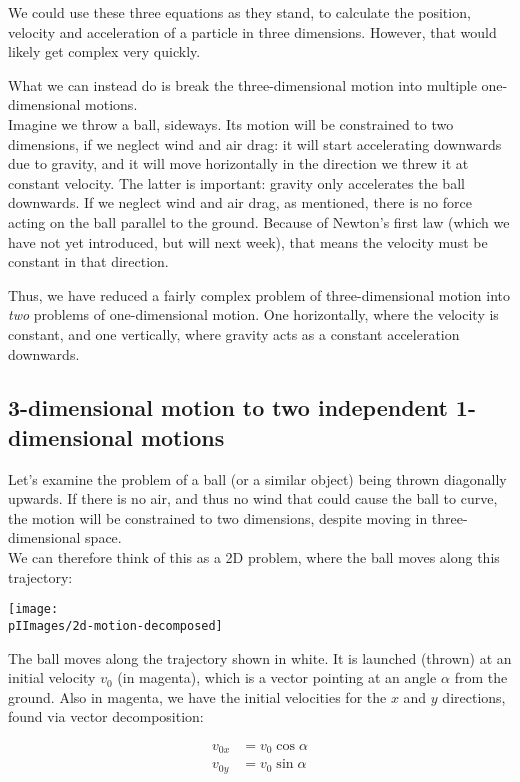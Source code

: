 We could use these three equations as they stand, to calculate the position, velocity and acceleration of a particle in three dimensions. However, that would likely get complex very quickly.

What we can instead do is break the three-dimensional motion into multiple one-dimensional motions.\\
Imagine we throw a ball, sideways. Its motion will be constrained to two dimensions, if we neglect wind and air drag: it will start accelerating downwards due to gravity, and it will move horizontally in the direction we threw it at constant velocity. The latter is important: gravity only accelerates the ball downwards. If we neglect wind and air drag, as mentioned, there is no force acting on the ball parallel to the ground. Because of Newton's first law (which we have not yet introduced, but will next week), that means the velocity must be constant in that direction.

Thus, we have reduced a fairly complex problem of three-dimensional motion into \emph{two} problems of one-dimensional motion. One horizontally, where the velocity is constant, and one vertically, where gravity acts as a constant acceleration downwards.

\newpage

\subsection{3-dimensional motion to two independent 1-dimensional motions}

Let's examine the problem of a ball (or a similar object) being thrown diagonally upwards. If there is no air, and thus no wind that could cause the ball to curve, the motion will be constrained to two dimensions, despite moving in three-dimensional space.\\
We can therefore think of this as a 2D problem, where the ball moves along this trajectory:

\begin{center}
\texttt{[image: \\pIImages/2d-motion-decomposed]}
\end{center}

The ball moves along the trajectory shown in white. It is launched (thrown) at an initial velocity $v_0$ (in magenta), which is a vector pointing at an angle $\alpha$ from the ground. Also in magenta, we have the initial velocities for the $x$ and $y$ directions, found via vector decomposition:

\begin{align}
v_{0x} &= v_0 \cos \alpha\\
v_{0y} &= v_0 \sin \alpha
\end{align}

